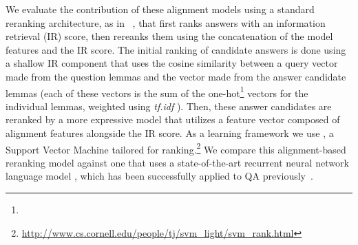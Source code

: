 We evaluate the contribution of these alignment models using a standard reranking architecture, as in ~\citet{jansen14}, that first ranks answers with an information retrieval (IR) score, then rereanks them using the concatenation of the model features and the IR score.
The initial ranking of candidate answers is done using a shallow IR component that uses the cosine similarity between a query vector made from the question lemmas and the vector made from the answer candidate lemmas (each of these vectors is the sum of the one-hot\footnote{} vectors for the individual lemmas, weighted using {\em tf.idf} \citep[Ch. 6,][]{manning08}).
Then, these answer candidates are reranked by a more expressive model that utilizes a feature vector composed of alignment features alongside the IR score.  As a learning framework we use \svmr , a Support Vector Machine tailored for ranking.\footnote{ \url{http://www.cs.cornell.edu/people/tj/svm_light/svm_rank.html}}
We compare this alignment-based reranking model against one that uses a state-of-the-art recurrent neural network language model \citep{mikolov10,mikolov13}, which has been successfully applied to QA previously~\citep[e.g.,][]{yih13}.



